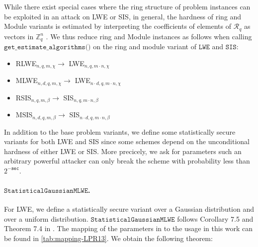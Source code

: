 While there exist special cases where the ring structure of problem instances can be exploited in an attack on LWE or SIS, %
in general, the hardness of ring and Module variants is estimated by interpreting the coefficients of elements of $\mathcal{R}_q$ as vectors in $\mathbb{Z}_q^n$ \cite{ACDDPPVW18}.
We thus reduce ring and Module instances as follows when calling $\texttt{get\_estimate\_algorithms()}$ on the ring and module variant of $\texttt{LWE}$ and $\texttt{SIS}$:
\begin{itemize}
    \item RLWE$_{n, q, m, \chi} \longrightarrow$ LWE$_{n, q, m \cdot n, \chi}$
    \item MLWE$_{n, d, q, m, \chi} \longrightarrow$ LWE$_{n \cdot d, q, m \cdot n, \chi}$
    \item RSIS$_{n, q, m, \beta} \longrightarrow$ SIS$_{n, q, m \cdot n, \beta}$
    \item MSIS$_{n, d, q, m, \beta} \longrightarrow$ SIS$_{n \cdot d, q, m \cdot n, \beta}$
\end{itemize}


In addition to the base problem variants, we define some statistically secure variants for both LWE and SIS since some schemes depend on the unconditional hardness of either LWE or SIS. More precicely, we ask for parameters such an arbitrary powerful attacker can only break the scheme with probability less than $2^{-\texttt{sec}}$.

\paragraph{$\texttt{StatisticalGaussianMLWE}$.} For LWE, we define a statistically secure variant over a Gaussian distribution and over a uniform distribution. $\texttt{StatisticalGaussianMLWE}$ follows Corollary 7.5 and Theorem 7.4 in \cite{LPR13}. The mapping of the parameters in \cite{LPR13} to the usage in this work can be found in \cref{tab:mapping-LPR13}. We obtain the following theorem:

